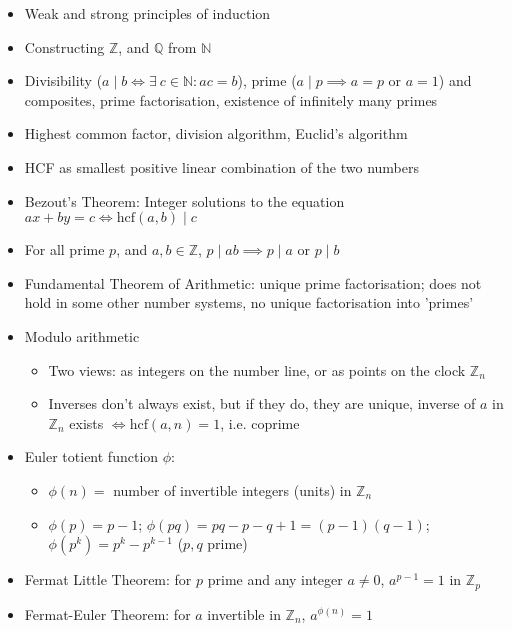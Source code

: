 \begin{itemize}
      \item Weak and strong principles of induction
      \item Constructing $\mathbb{Z}$, and $\mathbb{Q}$ from $\mathbb{N}$
      \item Divisibility ($a \mid b \iff \exists \: c \in \mathbb{N} : ac = b$), prime ($a \mid p \implies a=p \textrm{ or } a=1$) and composites, prime factorisation, existence of infinitely
            many primes
      \item Highest common factor, division algorithm, Euclid's algorithm
      \item HCF as smallest positive linear combination of the two numbers
      \item Bezout's Theorem: Integer solutions to the equation $ax+by=c\iff\textrm{hcf}(a,b)\mid c$
      \item For all prime $p$, and $a,b\in\mathbb{Z}$, $p\mid ab\implies p\mid a\textrm{ or }p\mid b$
      \item Fundamental Theorem of Arithmetic: unique prime factorisation; does
            not hold in some other number systems, no unique factorisation into
            'primes'
      \item Modulo arithmetic
            \begin{itemize}
                  \item Two views: as integers on the number line, or as points on the clock
                        $\mathbb{Z}_{n}$
                  \item Inverses don't always exist, but if they do, they are unique, inverse
                        of $a$ in $\mathbb{Z}_{n}$ exists $\iff\textrm{hcf}(a,n)=1$, i.e.
                        coprime
            \end{itemize}
      \item Euler totient function $\phi$:
            \begin{itemize}
                  \item $\phi(n)=$ number of invertible integers (units) in $\mathbb{Z}_{n}$
                  \item $\phi(p)=p-1$; $\phi(pq)=pq-p-q+1=(p-1)(q-1)$; $\phi(p^{k})=p^{k}-p^{k-1}$
                        ($p,q$ prime)
            \end{itemize}
      \item Fermat Little Theorem: for $p$ prime and any integer $a\neq 0$, $a^{p-1}=1$ in $\mathbb{Z}_{p}$
      \item Fermat-Euler Theorem: for $a$ invertible in $\mathbb{Z}_{n}$, $a^{\phi(n)}=1$

\end{itemize}
